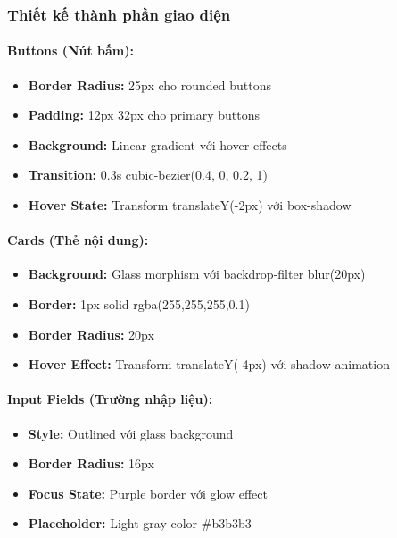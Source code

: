 \subsubsection{Thiết kế thành phần giao diện}

\paragraph{Buttons (Nút bấm):}
\begin{itemize}
    \item \textbf{Border Radius:} 25px cho rounded buttons
    \item \textbf{Padding:} 12px 32px cho primary buttons
    \item \textbf{Background:} Linear gradient với hover effects
    \item \textbf{Transition:} 0.3s cubic-bezier(0.4, 0, 0.2, 1)
    \item \textbf{Hover State:} Transform translateY(-2px) với box-shadow
\end{itemize}

\paragraph{Cards (Thẻ nội dung):}
\begin{itemize}
    \item \textbf{Background:} Glass morphism với backdrop-filter blur(20px)
    \item \textbf{Border:} 1px solid rgba(255,255,255,0.1)
    \item \textbf{Border Radius:} 20px
    \item \textbf{Hover Effect:} Transform translateY(-4px) với shadow animation
\end{itemize}

\paragraph{Input Fields (Trường nhập liệu):}
\begin{itemize}
    \item \textbf{Style:} Outlined với glass background
    \item \textbf{Border Radius:} 16px
    \item \textbf{Focus State:} Purple border với glow effect
    \item \textbf{Placeholder:} Light gray color \#b3b3b3
\end{itemize}

